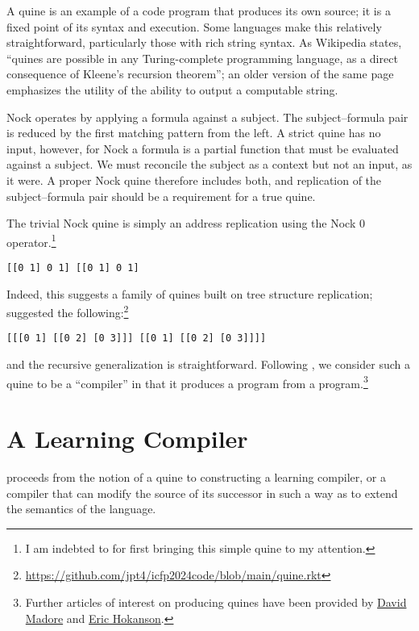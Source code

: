 \documentclass[twoside]{article}
\begin{document}
A quine is an example of a code program that produces its own source; it is a fixed point of its syntax and execution.  Some languages make this relatively straightforward, particularly those with rich string syntax.  As Wikipedia states, “quines are possible in any Turing-complete programming language, as a direct consequence of Kleene's recursion theorem”; an older version of the same page emphasizes the utility of the ability to output a computable string.

Nock operates by applying a formula against a subject.  The subject–formula pair is reduced by the first matching pattern from the left.  A strict quine has no input, however, for Nock a formula is a partial function that must be evaluated against a subject.  We must reconcile the subject as a context but not an input, as it were.  A proper Nock quine therefore includes both, and replication of the subject–formula pair should be a requirement for a true quine.

The trivial Nock quine is simply an address replication using the Nock 0 operator.\footnote{I am indebted to  for first bringing this simple quine to my attention.}
\begin{lstlisting}[style=listingcode]
[[0 1] 0 1] [[0 1] 0 1]
\end{lstlisting}
\noindent
Indeed, this suggests a family of quines built on tree structure replication;  suggested the following:\footnote{\url{https://github.com/jpt4/icfp2024code/blob/main/quine.rkt}}

\begin{lstlisting}[style=listingcode]
[[[0 1] [[0 2] [0 3]]] [[0 1] [[0 2] [0 3]]]]
\end{lstlisting}

\noindent
and the recursive generalization is straightforward.  Following \citeauthor{Thompson1984}, we consider such a quine to be a “compiler” in that it produces a program from a program.\footnote{Further articles of interest on producing quines have been provided by \href{http://www.madore.org/~david/computers/quine.html}{David Madore} and \href{https://erichokanson.me/category/quine-programs/}{Eric Hokanson}.}

\section{A Learning Compiler}

\citeauthor{Thompson1984} proceeds from the notion of a quine to constructing a learning compiler, or a compiler that can modify the source of its successor in such a way as to extend the semantics of the language.
\end{document}

